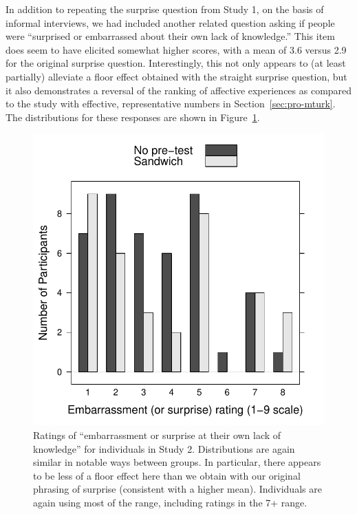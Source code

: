 In addition to repeating the surprise question from Study 1, on the basis of
informal interviews, we had included another related question asking if people
were “surprised or embarrassed about their own lack of knowledge.” This item
does seem to have elicited somewhat higher scores, with a mean of 3.6 versus 2.9
for the original surprise question. Interestingly, this not only appears to (at
least partially) alleviate a floor effect obtained with the straight surprise
question, but it also demonstrates a reversal of the ranking of affective
experiences as compared to the study with effective, representative numbers in
Section~\ref{sec:pro-mturk}. The distributions for these responses
are shown in Figure~\ref{fig:rpp-mech-embarrass}.

\begin{figure}
    \centering
    \includegraphics{RPP-mech-embarrass-by-group.pdf}
    \caption{Ratings of “embarrassment or surprise at their own lack of
        knowledge” for individuals in Study 2. Distributions are again similar in
        notable ways between groups. In particular, there appears to be less of
        a floor effect here than we obtain with our original phrasing of
        surprise (consistent with a higher mean).  Individuals are again using
        most of the range, including ratings in the 7+ range.}
    \label{fig:rpp-mech-embarrass}
\end{figure}


